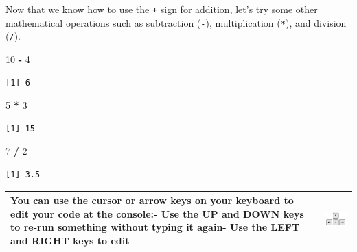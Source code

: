 \documentclass[]{article}
\newenvironment{Shaded}{\begin{snugshade}}{\end{snugshade}}
\newcommand{\DecValTok}[1]{\textcolor[rgb]{0.00,0.00,0.81}{#1}}
\newcommand{\OperatorTok}[1]{\textcolor[rgb]{0.81,0.36,0.00}{\textbf{#1}}}
\newcommand{\StringTok}[1]{\textcolor[rgb]{0.31,0.60,0.02}{#1}}
\begin{document}
Now that we know how to use the \texttt{+} sign for addition, let's try some other mathematical operations such as subtraction (\texttt{-}), multiplication (\texttt{*}), and division (\texttt{/}).

\begin{Shaded}
\begin{Highlighting}[]
\DecValTok{10} \OperatorTok{-}\StringTok{ }\DecValTok{4}
\end{Highlighting}
\end{Shaded}

\begin{verbatim}
[1] 6
\end{verbatim}

\begin{Shaded}
\begin{Highlighting}[]
\DecValTok{5} \OperatorTok{*}\StringTok{ }\DecValTok{3}
\end{Highlighting}
\end{Shaded}

\begin{verbatim}
[1] 15
\end{verbatim}

\begin{Shaded}
\begin{Highlighting}[]
\DecValTok{7} \OperatorTok{/}\StringTok{ }\DecValTok{2}
\end{Highlighting}
\end{Shaded}

\begin{verbatim}
[1] 3.5
\end{verbatim}

\begin{longtable}[]{@{}ll@{}}
\toprule
\endhead
\begin{minipage}[t]{0.69\columnwidth}\raggedright
You can use the cursor or arrow keys on your keyboard to edit your code at the console:- Use the UP and DOWN keys to re-run something without typing it again- Use the LEFT and RIGHT keys to edit\strut
\end{minipage} & \begin{minipage}[t]{0.25\columnwidth}\raggedright
\includegraphics{./img/rstudio_cursorkeys.png}\strut
\end{minipage}\tabularnewline
\bottomrule
\end{longtable}
\end{document}
